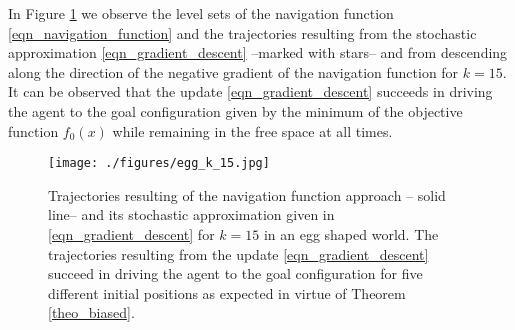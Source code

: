 \documentclass[article]{IEEEtran}
\theoremstyle{definition}
\begin{document}
In Figure \ref{fig_egg} we observe the level sets of the navigation function \eqref{eqn_navigation_function} and the trajectories resulting from the stochastic approximation \eqref{eqn_gradient_descent} --marked with stars-- and from descending along the direction of the negative gradient of the navigation function for $k=15$. It can be observed that the update \eqref{eqn_gradient_descent} succeeds in driving the agent to the goal configuration given by the minimum of the objective function $f_0(x)$ while remaining in the free space at all times. 
%
\begin{figure}
\centering
\texttt{[image: ./figures/egg\_k\_15.jpg]}
\caption{Trajectories resulting of the navigation function approach -- solid line-- and its stochastic approximation given in \eqref{eqn_gradient_descent} for $k=15$ in an egg shaped world. The trajectories resulting from the update \eqref{eqn_gradient_descent} succeed in driving the agent to the goal configuration for five different initial positions as expected in virtue of Theorem \ref{theo_biased}. }\label{fig_egg}
\end{figure}
\end{document}
